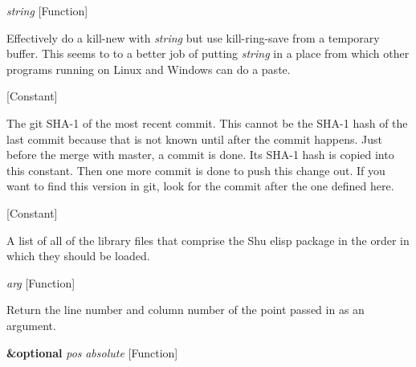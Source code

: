 \vspace{1em}
\noindent
{}
\usebox{\funcname}\emph{string}
 \hfill [Function]

\begin{doc-string}
Effectively do a kill-new with \emph{string} but use kill-ring-save from
a temporary buffer.  This seems to to a better job of putting \emph{string}
in a place from which other programs running on Linux and Windows can
do a paste.
\end{doc-string}

\vspace{1em}
\noindent
{}
\usebox{\funcname}
 \hfill [Constant]

\begin{doc-string}
The git SHA-1 of the most recent commit.  This cannot be the SHA-1 hash of
the last commit because that is not known until after the commit happens.  Just
before the merge with master, a commit is done.  Its SHA-1 hash is copied into
this constant.  Then one more commit is done to push this change out.  If you
want to find this version in git, look for the commit after the one defined
here.
\end{doc-string}

\vspace{1em}
\noindent
{}
\usebox{\funcname}
 \hfill [Constant]

\begin{doc-string}
A list of all of the library files that comprise the Shu elisp package in the
order in which they should be loaded.
\end{doc-string}

\vspace{1em}
\noindent
{}
\usebox{\funcname}\emph{arg}
 \hfill [Function]

\begin{doc-string}
Return the line number and column number of the point passed in as an argument.
\end{doc-string}

\vspace{1em}
\noindent
{}
\usebox{\funcname}\textbf{\&optional} \emph{pos} \emph{absolute}
 \hfill [Function]

